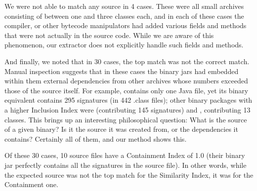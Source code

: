 We were not able to match any source in 4 cases.  These were all small
archives consisting of between one and three classes each, and in each of
these cases the compiler, or other bytecode manipulators had added various
fields and methods that were not actually in the source code.  While we are
aware of this phenomenon, our extractor does not explicitly handle such
fields and methods.


And finally, we noted that in 30 cases, the top match was not the correct
match.  Manual inspection suggests that in these cases the binary jars had
embedded within them external dependencies from other archives whose
numbers exceeded those of the source itself.  For example,
 contains only one
Java file, yet its binary equivalent 
contains 295 signatures (in 442 .class files); other binary
packages with a higher Inclusion Index were 
(contributing 145 signatures) and , contributing 13
classes.  This brings up an interesting philosophical question: What is the
source of a given binary?  Is it the source it was created from, or the
dependencies it contains?  Certainly all of them, and our method shows
this.

Of these 30 cases, 10 source files have a Containment Index of 1.0 (their
binary jar perfectly contains all the signatures in the source file). In
other words, while the expected source was not the top match for the
Similarity Index, it was for the Containment one.




